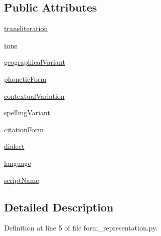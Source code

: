 \subsection*{Public Attributes}
\begin{DoxyCompactItemize}
\item 
\hyperlink{classsrc_1_1core_1_1form__representation_1_1_form_representation_afe034e736b48176000fca76d8b8604ef}{transliteration}
\item 
\hyperlink{classsrc_1_1core_1_1form__representation_1_1_form_representation_a5b9d85ec2c63d3d93f09da2c569234a0}{tone}
\item 
\hyperlink{classsrc_1_1core_1_1form__representation_1_1_form_representation_a810f62688bdea5e822712c4382c6d6f3}{geographical\+Variant}
\item 
\hyperlink{classsrc_1_1core_1_1form__representation_1_1_form_representation_aab45e1639b37a2b07631aa47729ed09d}{phonetic\+Form}
\item 
\hyperlink{classsrc_1_1core_1_1form__representation_1_1_form_representation_ab29cfe204850c7d0d7348605b570cc5c}{contextual\+Variation}
\item 
\hyperlink{classsrc_1_1core_1_1form__representation_1_1_form_representation_acbb491e2075ba5ce28b7159e1fa42154}{spelling\+Variant}
\item 
\hyperlink{classsrc_1_1core_1_1form__representation_1_1_form_representation_a467fc5cd662d8577f16725637a7dc7ad}{citation\+Form}
\item 
\hyperlink{classsrc_1_1core_1_1form__representation_1_1_form_representation_abc0dcbe740b5309dd4e4a111bdc11965}{dialect}
\item 
\hyperlink{classsrc_1_1core_1_1form__representation_1_1_form_representation_afd3e6d24af2c00ddf6286305aea9bb6f}{language}
\item 
\hyperlink{classsrc_1_1core_1_1form__representation_1_1_form_representation_a4d1bead536706462cc8c8851ffb53ad5}{script\+Name}
\end{DoxyCompactItemize}


\subsection{Detailed Description}


Definition at line 5 of file form\+\_\+representation.\+py.



